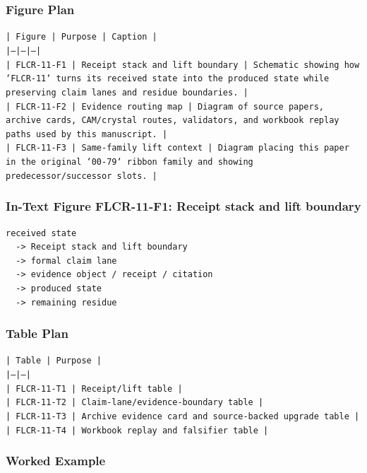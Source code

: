 \documentclass[11pt]{article}
\begin{document}
\subsubsection*{Figure Plan}

\noindent\texttt{| Figure | Purpose | Caption |}\\
\noindent\texttt{|---|---|---|}\\
\noindent\texttt{| FLCR-11-F1 | Receipt stack and lift boundary | Schematic showing how `FLCR-11` turns its received state into the produced state while preserving claim lanes and residue boundaries. |}\\
\noindent\texttt{| FLCR-11-F2 | Evidence routing map | Diagram of source papers, archive cards, CAM/crystal routes, validators, and workbook replay paths used by this manuscript. |}\\
\noindent\texttt{| FLCR-11-F3 | Same-family lift context | Diagram placing this paper in the original `00-79` ribbon family and showing predecessor/successor slots. |}\\

\subsubsection*{In-Text Figure FLCR-11-F1: Receipt stack and lift boundary}

\begin{verbatim}
received state
  -> Receipt stack and lift boundary
  -> formal claim lane
  -> evidence object / receipt / citation
  -> produced state
  -> remaining residue
\end{verbatim}

\subsubsection*{Table Plan}

\noindent\texttt{| Table | Purpose |}\\
\noindent\texttt{|---|---|}\\
\noindent\texttt{| FLCR-11-T1 | Receipt/lift table |}\\
\noindent\texttt{| FLCR-11-T2 | Claim-lane/evidence-boundary table |}\\
\noindent\texttt{| FLCR-11-T3 | Archive evidence card and source-backed upgrade table |}\\
\noindent\texttt{| FLCR-11-T4 | Workbook replay and falsifier table |}\\

\subsubsection*{Worked Example}
\end{document}
